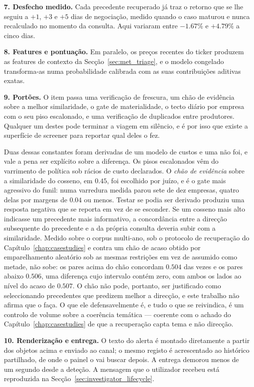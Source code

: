 \textbf{7. Desfecho medido.} Cada precedente recuperado já traz o retorno que se lhe seguiu a $+1$,
$+3$ e $+5$ dias de negociação, medido quando o caso maturou e nunca recalculado no momento da
consulta. Aqui variaram entre $-1.67\%$ e $+4.79\%$ a cinco dias.

\textbf{8. Features e pontuação.} Em paralelo, os preços recentes do ticker produzem as features de
contexto da Secção~\ref{sec:met_triage}, e o modelo congelado transforma-as numa probabilidade
calibrada com as suas contribuições aditivas exatas.

\textbf{9. Portões.} O item passa uma verificação de frescura, um chão de evidência sobre a melhor
similaridade, o gate de materialidade, o tecto diário por empresa com o seu piso escalonado, e uma
verificação de duplicados entre produtores. Qualquer um destes pode terminar a viagem em silêncio, e é
por isso que existe a superfície de screener para reportar qual deles o fez.

Duas dessas constantes foram derivadas de um modelo de custos e uma não foi, e vale a pena ser
explícito sobre a diferença. Os pisos escalonados vêm do varrimento de política sob rácios de custo
declarados. O \emph{chão de evidência} sobre a similaridade do cosseno, em $0.45$, foi escolhido por
juízo, e é o gate mais agressivo do funil: numa varredura medida parou sete de dez empresas, quatro
delas por margens de $0.04$ ou menos. Testar se podia ser derivado produziu uma resposta negativa que
se reporta em vez de se esconder. Se um cosseno mais alto indicasse um precedente mais informativo, a
concordância entre a direcção subsequente do precedente e a da própria consulta deveria subir com a
similaridade. Medido sobre o corpus multi-ano, sob o protocolo de recuperação do
Capítulo~\ref{chap:casestudies} e contra um chão de acaso obtido por emparelhamento aleatório sob as
mesmas restrições em vez de assumido como metade, não sobe: os pares acima do chão concordam $0.504$
das vezes e os pares abaixo $0.506$, uma diferença cujo intervalo contém zero, com ambos os lados ao
nível do acaso de $0.507$. O chão não pode, portanto, ser justificado como seleccionando precedentes
que predizem melhor a direcção, e este trabalho não afirma que o faça. O que ele defensavelmente é, e
tudo o que se reivindica, é um controlo de volume sobre a coerência temática --- coerente com o
achado do Capítulo~\ref{chap:casestudies} de que a recuperação capta tema e não direcção.

\textbf{10. Renderização e entrega.} O texto do alerta é montado diretamente a partir dos objetos
acima e enviado ao canal; o mesmo registo é acrescentado ao histórico partilhado, de onde o painel o
vai buscar depois. A entrega demorou menos de um segundo desde a deteção. A mensagem que o utilizador
recebeu está reproduzida na Secção~\ref{sec:investigator_lifecycle}.

